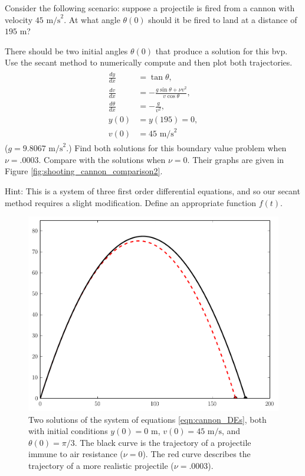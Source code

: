 \begin{problem}
Consider the following scenario: suppose a projectile is fired from a cannon with velocity $45\text{ m/s}^2$.
At what angle $\theta(0)$ should it be fired to land at a distance of $195\text{ m}$? 

There should be two initial angles $\theta(0)$ that produce a solution for this bvp.
Use the secant method to numerically compute and then plot both trajectories.
\begin{align}
	\label{eqn:cannon_shooting}
	\begin{split}
\frac{dy}{dx} &= \tan {\theta} ,\\
\frac{dv}{dx} &= -\frac{g \sin{\theta} + \nu v^2}{v \cos{\theta}},\\
\frac{d\theta}{dx} &= -\frac{g}{v^2},\\
y(0)&= y(195) = 0,\\
v(0) &= 45 \text{ m/s}^2
	\end{split}
\end{align}
($g = 9.8067\text{ m/s}^2$.)
Find both solutions for this boundary value problem when $\nu = .0003$.
Compare with the solutions when $\nu = 0.$
Their graphs are given in Figure \ref{fig:shooting_cannon_comparison2}.

Hint: This is a system of three first order differential equations, and so our secant method requires a slight modification.
Define an appropriate function $f(t)$. 
\end{problem}

\begin{figure}
\includegraphics[width=\textwidth]{Cannon_with_AirResistance.pdf}
\caption{Two solutions of the system of equations \eqref{eqn:cannon_DEs}, both with initial conditions  $y(0) = 0 \text{ m}$, $ v(0) = 45 \text{ m/s}$, and $\theta(0)=\pi/3$.
The black curve is the trajectory of a projectile immune to air resistance ($\nu = 0$).
The red curve describes the trajectory of a more realistic projectile ($\nu = .0003$).}
\label{fig:shooting_cannon_comparison1}
\end{figure}

